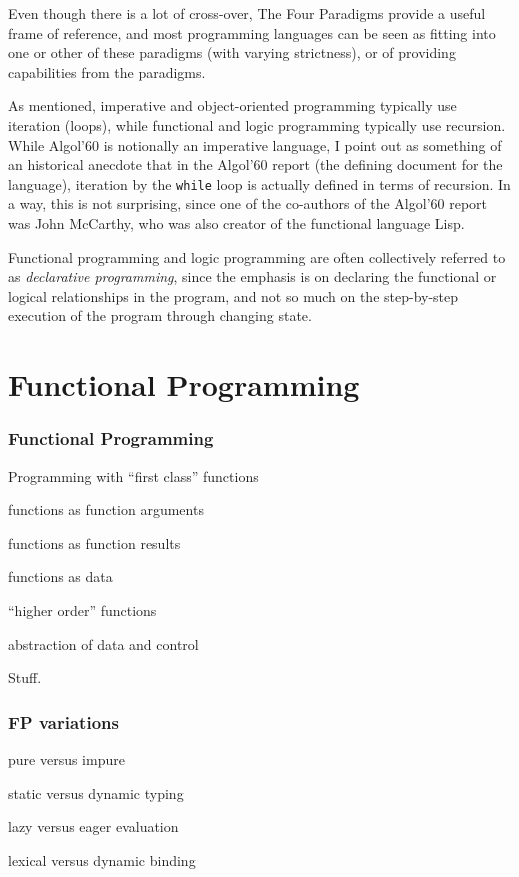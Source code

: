 \begin{frame}
\begin{annotation}
Even though there is a lot of cross-over, The Four Paradigms
provide a useful frame of reference, and most programming
languages can be seen as fitting into one or other of these
paradigms (with varying strictness), or of providing
capabilities from the paradigms.

As mentioned, imperative and object-oriented programming
typically use iteration (loops), while functional and logic
programming typically use recursion.  While Algol'60 is
notionally an imperative language, I point out as something of
an historical anecdote that in the Algol'60 report (the defining
document for the language), iteration by the \texttt{while} loop
is actually defined in terms of recursion.  In a way, this is
not surprising, since one of the co-authors of the Algol'60
report was John McCarthy, who was also creator of the functional
language Lisp.
\end{annotation}
\end{frame}

\begin{annotation}
Functional programming and logic programming are often
collectively referred to as \emph{declarative programming},
since the emphasis is on declaring the functional or
logical relationships in the program, and not so much on the
step-by-step execution of the program through changing state.
\end{annotation}

\section{Functional Programming}


\begin{frame}
\frametitle{Functional Programming}
Programming with ``first class'' functions
\bi
\item functions as function arguments
\item functions as function results
\item functions as data
\item ``higher order'' functions
\item abstraction of data and control
\ei
\end{frame}

\begin{annotation}
Stuff.
\end{annotation}

\begin{frame}
\frametitle{FP variations}
\bi
\item pure versus impure
\item static versus dynamic typing
\item lazy versus eager evaluation
\item lexical versus dynamic binding
\ei
\end{frame}


